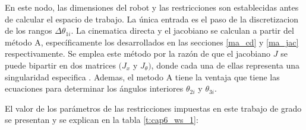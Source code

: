    
    En este nodo, las dimensiones del robot y las restricciones son establecidas antes de calcular el espacio de trabajo. La única entrada es el paso de la discretizacion de los rangos \(  \Delta  \theta _{1i} \). La cinematica directa y el jacobiano se calculan a partir del método A, específicamente los desarrollados en las secciones \ref{ma_cd} y \ref{ma_jac} respectivamente. Se emplea este método por la razón de que el jacobiano $J$ se puede bipartir en dos matrices $(J_{x}$  y  $J_{ \theta })$, donde cada una de ellas representa una singularidad especifica . Ademas, el metodo A tiene la ventaja que tiene las ecuaciones para determinar los ángulos interiores $\theta_{2i}$ y $\theta_{3i}$.
    
    \newpage
    
    El valor de los parámetros de las restricciones impuestas en este trabajo de grado se presentan y se explican en la tabla \ref{t:cap6_ws_1}: 
    
